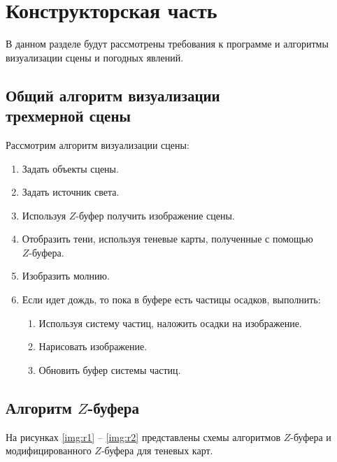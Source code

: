 \chapter{Конструкторская часть}

В данном разделе будут рассмотрены требования к программе и
алгоритмы визуализации сцены и погодных явлений.

\section{Общий алгоритм визуализации \\трехмерной сцены}

Рассмотрим алгоритм визуализации сцены:
\begin{enumerate}[label=\arabic*)]
    \item Задать объекты сцены.
    \item Задать источник света.
    \item Используя $Z$-буфер получить изображение сцены.
    \item Отобразить тени, используя теневые карты, полученные с помощью \\$Z$-буфера.
    \item Изобразить молнию.
    \item Если идет дождь, то пока в буфере есть частицы осадков, выполнить:
    \begin{enumerate}[label=\arabic*)]
        \item Используя систему частиц, наложить осадки на изображение.
        \item Нарисовать изображение.
        \item Обновить буфер системы частиц.
    \end{enumerate} 
\end{enumerate} 

\section{Алгоритм $Z$-буфера}

На рисунках \ref{img:r1} -- \ref{img:r2} представлены схемы алгоритмов $Z$-буфера и модифицированного $Z$-буфера для теневых карт.

